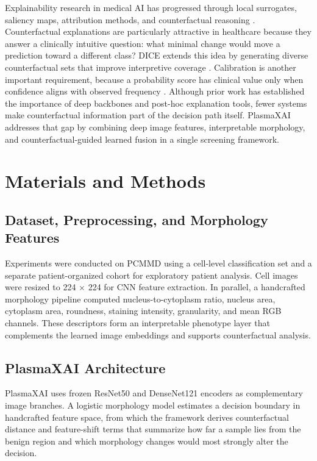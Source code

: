 \documentclass[runningheads]{llncs}
\begin{document}
Explainability research in medical AI has progressed through local surrogates, saliency maps, attribution methods, and counterfactual reasoning \cite{lime,gradcam,shap,wachter}. Counterfactual explanations are particularly attractive in healthcare because they answer a clinically intuitive question: what minimal change would move a prediction toward a different class? DICE extends this idea by generating diverse counterfactual sets that improve interpretive coverage \cite{diceml}. Calibration is another important requirement, because a probability score has clinical value only when confidence aligns with observed frequency \cite{calibration}. Although prior work has established the importance of deep backbones and post-hoc explanation tools, fewer systems make counterfactual information part of the decision path itself. PlasmaXAI addresses that gap by combining deep image features, interpretable morphology, and counterfactual-guided learned fusion in a single screening framework.

\section{Materials and Methods}
\subsection{Dataset, Preprocessing, and Morphology Features}
Experiments were conducted on PCMMD using a cell-level classification set and a separate patient-organized cohort for exploratory patient analysis. Cell images were resized to 224 $\times$ 224 for CNN feature extraction. In parallel, a handcrafted morphology pipeline computed nucleus-to-cytoplasm ratio, nucleus area, cytoplasm area, roundness, staining intensity, granularity, and mean RGB channels. These descriptors form an interpretable phenotype layer that complements the learned image embeddings and supports counterfactual analysis.

\subsection{PlasmaXAI Architecture}
PlasmaXAI uses frozen ResNet50 and DenseNet121 encoders as complementary image branches. A logistic morphology model estimates a decision boundary in handcrafted feature space, from which the framework derives counterfactual distance and feature-shift terms that summarize how far a sample lies from the benign region and which morphology changes would most strongly alter the decision.
\end{document}
